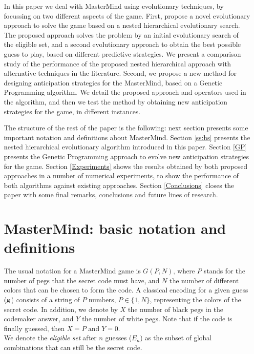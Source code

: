 In this paper we deal with MasterMind using evolutionary techniques,
by focussing on two different aspects of the game. First, propose a novel evolutionary approach to solve the game
based on a nested hierarchical evolutionary search. The
proposed approach solves the problem by an initial evolutionary search
of the eligible set, and a second evolutionary approach to obtain the
best possible guess to play, based on different predictive
strategies. We present a comparison study of the performance of the
proposed nested hierarchical approach with alternative techniques in the literature.
Second, we propose a new method for designing anticipation strategies for the MasterMind,
based on a Genetic Programming algorithm. We detail the proposed approach and
operators used in the algorithm, and then we test the method by obtaining new anticipation
strategies for the game, in different instances.

The structure of the rest of the paper is the following: next section
presents some important notation and definitions about MasterMind. Section \ref{ss:bs} presents the nested
hierarchical evolutionary algorithm introduced in this paper. Section \ref{GP} presents the
Genetic Programming approach to evolve new anticipation strategies for the game.
Section \ref{Experiments} shows the results obtained by both proposed approaches in a
number of numerical experiments, to show the performance of both
algorithms against existing approaches. Section \ref{Conclusions} closes the paper with some final
remarks, conclusions and future lines of research.

\section{MasterMind: basic notation and definitions}\label{Notation}

The usual notation for a MasterMind game is $G(P,N)$, where $P$ stands for the number of pegs that the secret code must have, and $N$ the number of different colors that can be chosen to form the code. A classical encoding for a given guess (${\bf g}$) consists of a string of $P$ numbers, $P \in \{1,N\}$, representing the colors of the secret code. In addition, we denote by $X$ the number of black pegs in the codemaker answer, and $Y$ the number of white pegs. Note that if the code is finally guessed, then $X=P$ and $Y=0$.\\

 We denote the {\em eligible set} after $n$ guesses ($E_n$) as the subset of global combinations that can still be the secret code.\\

